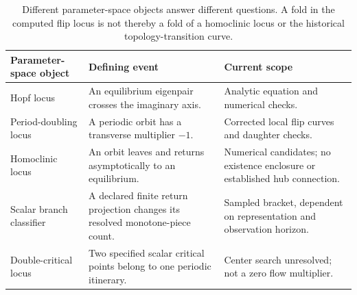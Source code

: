 \begin{table}[tbp]
\centering
\small
\renewcommand{\arraystretch}{1.15}
\begin{tabularx}{\textwidth}{@{}P{0.25\textwidth}>{\raggedright\arraybackslash}X>{\raggedright\arraybackslash}X@{}}
\toprule
Parameter-space object & Defining event & Current scope \\
\midrule
Hopf locus & An equilibrium eigenpair crosses the imaginary axis. &
Analytic equation and numerical checks. \\
Period-doubling locus & A periodic orbit has a transverse multiplier $-1$. &
Corrected local flip curves and daughter checks. \\
Homoclinic locus & An orbit leaves and returns asymptotically to an equilibrium. &
Numerical candidates; no existence enclosure or established hub connection. \\
Scalar branch classifier & A declared finite return projection changes its
resolved monotone-piece count. & Sampled bracket, dependent on representation
and observation horizon. \\
Double-critical locus & Two specified scalar critical points belong to one
periodic itinerary. & Center search unresolved; not a zero flow multiplier. \\
\bottomrule
\end{tabularx}
\caption{Different parameter-space objects answer different questions. A fold in the computed
flip locus is not thereby a fold of a homoclinic locus or the historical
topology-transition curve.}
\label{tab:distinct-loci}
\end{table}
